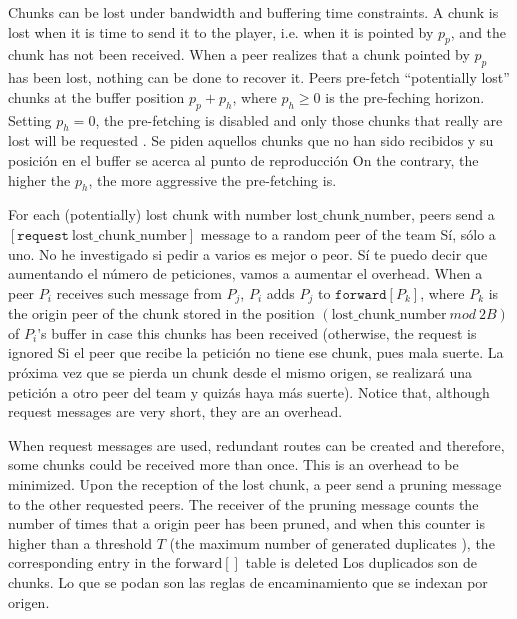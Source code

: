 

\label{sec:routes_discovery}

Chunks can be lost under bandwidth and buffering time constraints. A
chunk is lost when it is time to send it to the player, i.e. when it
is pointed by $p_p$, and the chunk has not been received.  When a peer
realizes that a chunk pointed by $p_p$ has been lost, nothing can be
done to recover it. Peers pre-fetch ``potentially lost'' chunks at the
buffer position $p_p+p_h$, where $p_h\geq 0$ is the pre-feching
horizon. Setting $p_h=0$, the pre-fetching is disabled and only those
chunks that really are lost will be requested . {\color{red} Se piden aquellos chunks que no han sido
  recibidos y su posición en el buffer se acerca al punto de
  reproducción} On the contrary, the higher the $p_h$, the more
aggressive the pre-fetching is.

For each (potentially) lost chunk with number
$\text{lost\_chunk\_number}$, peers send a
$[\mathtt{request}~\text{lost\_chunk\_number}]$ message to a random
peer of the team
{\color{red} Sí, sólo a uno. No he investigado si pedir a varios es
  mejor o peor. Sí te puedo decir que aumentando el número de
  peticiones, vamos a aumentar el overhead}. When a peer $P_i$
receives such message from $P_j$, $P_i$ adds $P_j$ to
$\mathtt{forward}[P_k]$, where $P_k$ is the origin peer of the chunk
stored in the position $(\text{lost\_chunk\_number}~\mathit{mod}~2B)$
of $P_i$'s buffer in case this chunks has been received (otherwise,
the request is ignored  {\color{red} Si el
  peer que recibe la petición no tiene ese chunk, pues mala suerte. La
  próxima vez que se pierda un chunk desde el mismo origen, se
  realizará una petición a otro peer del team y quizás haya más
  suerte}). Notice that, although request messages are very short,
they are an overhead.

When request messages are used, redundant routes can be created and
therefore, some chunks could be received more than once. This is an
overhead to be minimized. Upon the reception of the lost chunk, a peer
send a pruning message to the other requested peers. The receiver of
the pruning message counts the number of times that a origin peer has
been pruned, and when this counter is higher than a threshold $T$ (the
maximum number of generated duplicates ), the
corresponding entry in the $\text{forward}[]$ table is deleted
 {\color{red} Los duplicados son de
  chunks. Lo que se podan son las reglas de encaminamiento que se
  indexan por origen.}

